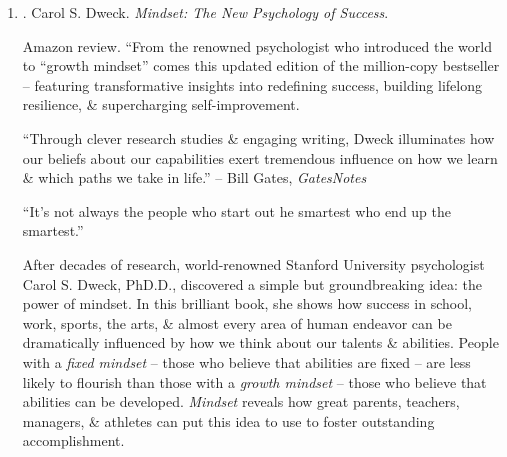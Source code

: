 \documentclass{article}
\begin{document}
\begin{enumerate}
	\item \cite{Dweck_mindset}. {\sc Carol S. Dweck}. {\it Mindset: The New Psychology of Success}. {}
	
	{\sf Amazon review.} ``From the renowned psychologist who introduced the world to ``growth mindset'' comes this updated edition of the million-copy bestseller -- featuring transformative insights into redefining success, building lifelong resilience, \& supercharging self-improvement.
	
	``Through clever research studies \& engaging writing, {\sc Dweck} illuminates how our beliefs about our capabilities exert tremendous influence on how we learn \& which paths we take in life.'' -- {\sc Bill Gates}, {\it GatesNotes}
	
	``It's not always the people who start out he smartest who end up the smartest.''
	
	After decades of research, world-renowned Stanford University psychologist {\sc Carol S. Dweck}, PhD.D., discovered a simple but groundbreaking idea: the power of mindset. In this brilliant book, she shows how success in school, work, sports, the arts, \& almost every area of human endeavor can be dramatically influenced by how we think about our talents \& abilities. People with a {\it fixed mindset} -- those who believe that abilities are fixed -- are less likely to flourish than those with a {\it growth mindset} -- those who believe that abilities can be developed. {\it Mindset} reveals how great parents, teachers, managers, \& athletes can put this idea to use to foster outstanding accomplishment.
	

\end{enumerate}
\end{document}
